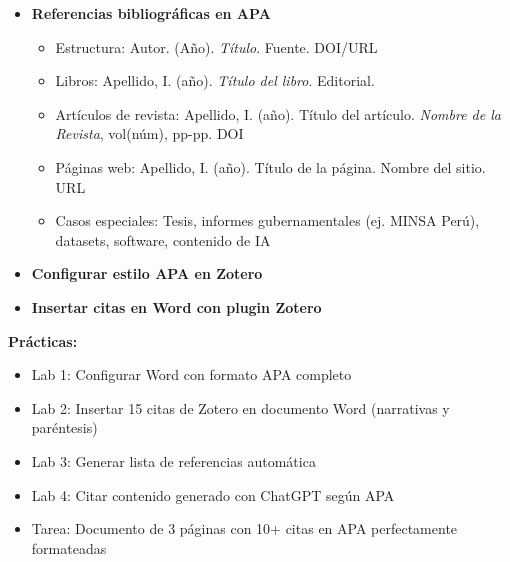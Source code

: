 \documentclass[12pt,a4paper]{yaac-luatex}
\begin{document}
\begin{tcolorbox}[
		enhanced,
		colback=white,
		colframe=curso2color,
		arc=3pt,
		boxrule=1.5pt,
		left=10pt,
		right=10pt,
		top=8pt,
		bottom=8pt,
		breakable
		]
\begin{itemize}[leftmargin=*, itemsep=0.1cm]
\begin{itemize}
				\item Dos autores: (Pérez \& Gómez, 2019)
				\item Tres o más autores: (López et al., 2021)
				\item Sin autor: (Título del artículo, 2022)
				\item Citas secundarias: (Original, año, como se citó en Secundaria, año)
			\end{itemize}
			\item \textbf{Referencias bibliográficas en APA}
			\begin{itemize}
				\item Estructura: Autor. (Año). \textit{Título}. Fuente. DOI/URL
				\item Libros: Apellido, I. (año). \textit{Título del libro}. Editorial.
				\item Artículos de revista: Apellido, I. (año). Título del artículo. \textit{Nombre de la Revista}, vol(núm), pp-pp. DOI
				\item Páginas web: Apellido, I. (año). Título de la página. Nombre del sitio. URL
				\item Casos especiales: Tesis, informes gubernamentales (ej. MINSA Perú), datasets, software, contenido de IA
			\end{itemize}
			\item \textbf{Configurar estilo APA en Zotero}
			\item \textbf{Insertar citas en Word con plugin Zotero}
		\end{itemize}
		
		\textbf{Prácticas:}
		\begin{itemize}[leftmargin=*, itemsep=0.1cm]
			\item Lab 1: Configurar Word con formato APA completo
			\item Lab 2: Insertar 15 citas de Zotero en documento Word (narrativas y paréntesis)
			\item Lab 3: Generar lista de referencias automática
			\item Lab 4: Citar contenido generado con ChatGPT según APA
			\item Tarea: Documento de 3 páginas con 10+ citas en APA perfectamente formateadas
		\end{itemize}
	\end{tcolorbox}
	
	\vspace{0.3cm}
	
\end{document}
